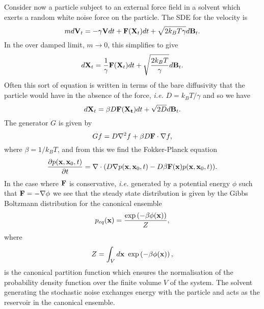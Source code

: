 \documentclass[11pt]{report}
\begin{document}
Consider now a particle subject to an external force field in a solvent which exerts a random white noise force on the particle. The SDE for the velocity is
\begin{equation}
m d{\bf V}_t = -\gamma {\bf V}  dt + {\bf F}({\bf X}_t) dt + \sqrt{2 k_BT\gamma} d{\bf B}_t .
\end{equation}
In the over damped limit, $m\to 0$, this simplifies to give
\begin{equation}
d{\bf X}_t = {1\over \gamma}{\bf F}({\bf X}_t) dt + \sqrt{\frac{2 k_BT}{\gamma}} d{\bf B}_t.
\end{equation}
Often this sort of equation is written in terms of the bare diffusivity that the particle
would have in the absence of the force, {\em i.e.} $ D = k_BT/\gamma$ and so we have
\begin{equation}
d{\bf X}_t = \beta D{\bf F}({\bf X_t}) dt + \sqrt{2D} d{\bf B}_t.
\end{equation}
The generator $G$ is given by
\begin{equation}
Gf = D\nabla^2 f + \beta D{\bf F}\cdot\nabla f,
\end{equation}
where $\beta = 1/k_BT$, and from this we find the Fokker-Planck equation
\begin{equation}
\frac{\partial p({\bf x},{\bf x}_0,t)}{\partial t} = \nabla \cdot (D\nabla p({\bf x},{\bf x}_0,t) -D\beta {\bf F}({\bf x}) p({\bf x},{\bf x}_0,t)).
\end{equation}
In the case where ${\bf F}$ is conservative, {\em i.e.} generated by a potential energy $\phi$ 
such that ${\bf F} = -\nabla \phi$ we see that the steady state distribution is given by the Gibbs Boltzmann distribution for the canonical ensemble
\begin{equation}
p_{eq}({\bf x}) = \frac{\exp\left(-\beta \phi({\bf x})\right)}{Z},
\end{equation}
where 
\begin{equation}
Z = \int_V d{\bf x}\ \exp\left(-\beta \phi({\bf x})\right),
\end{equation}
is the canonical partition function which ensures the normalisation of the probability density function over the finite volume $V$ of the system. The solvent generating the stochastic noise exchanges energy with the particle and acts as the reservoir in the canonical ensemble. 
  
\end{document}
